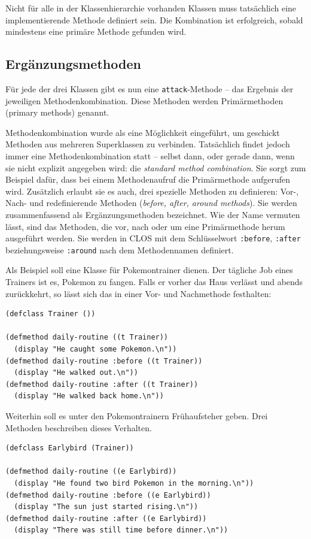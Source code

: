 Nicht für alle in der Klassenhierarchie vorhanden Klassen muss tatsächlich eine implementierende Methode definiert sein. Die Kombination ist erfolgreich, sobald mindestens eine primäre Methode gefunden wird.

\subsection{Ergänzungsmethoden}
\label{ergmeth}
Für jede der drei Klassen gibt es nun eine \texttt{attack}-Methode -- das Ergebnis der jeweiligen Methodenkombination. Diese Methoden werden Primärmethoden (primary methods) genannt.

Methodenkombination wurde als eine Möglichkeit eingeführt, um geschickt Methoden aus mehreren Superklassen zu verbinden. Tatsächlich findet jedoch immer eine Methodenkombination statt -- selbst dann, oder gerade dann, wenn sie nicht explizit angegeben wird: die \textit{standard method combination}. Sie sorgt zum Beispiel dafür, dass bei einem Methodenaufruf die Primärmethode aufgerufen wird. Zusätzlich erlaubt sie es auch, drei spezielle Methoden zu definieren: Vor-, Nach- und redefinierende Methoden (\emph{before, after, around methods}). Sie werden zusammenfassend als Ergänzungsmethoden  bezeichnet. Wie der Name vermuten lässt, sind das Methoden, die vor, nach oder um eine Primärmethode herum ausgeführt werden. Sie werden in CLOS mit dem Schlüsselwort \texttt{:before}, \texttt{:after} beziehungsweise \texttt{:around} nach dem Methodennamen definiert.

Als Beispiel soll eine Klasse für Pokemontrainer dienen. Der tägliche Job eines Trainers ist es, Pokemon zu fangen. Falls er vorher das Haus verlässt und abends zurückkehrt, so lässt sich das in einer Vor- und Nachmethode festhalten:

\begin{lstlisting}
(defclass Trainer ())

(defmethod daily-routine ((t Trainer))
  (display "He caught some Pokemon.\n"))
(defmethod daily-routine :before ((t Trainer))
  (display "He walked out.\n"))
(defmethod daily-routine :after ((t Trainer))
  (display "He walked back home.\n"))
\end{lstlisting}

Weiterhin soll es unter den Pokemontrainern Frühaufsteher geben. Drei Methoden beschreiben dieses Verhalten.

\begin{lstlisting}
(defclass Earlybird (Trainer))

(defmethod daily-routine ((e Earlybird))
  (display "He found two bird Pokemon in the morning.\n"))
(defmethod daily-routine :before ((e Earlybird))
  (display "The sun just started rising.\n"))
(defmethod daily-routine :after ((e Earlybird))
  (display "There was still time before dinner.\n"))
\end{lstlisting}

